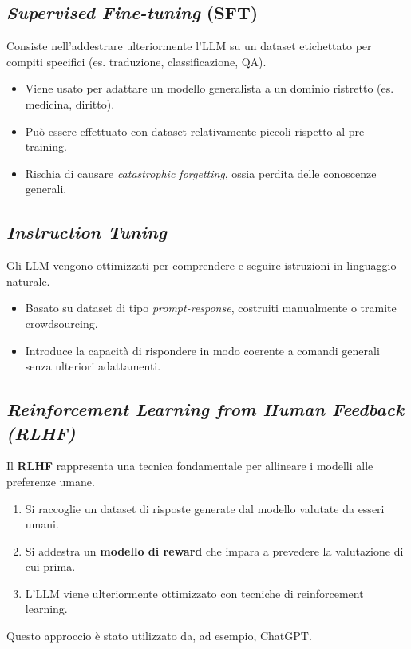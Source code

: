 \subsection{\textit{Supervised Fine-tuning} (SFT)}
Consiste nell'addestrare ulteriormente l'LLM su un dataset etichettato per compiti specifici (es. traduzione, classificazione, QA).
\begin{itemize}
    \item Viene usato per adattare un modello generalista a un dominio ristretto (es. medicina, diritto).
    \item Può essere effettuato con dataset relativamente piccoli rispetto al pre-training.
    \item Rischia di causare \textit{catastrophic forgetting}, ossia perdita delle conoscenze generali.
\end{itemize}

\subsection{\textit{Instruction Tuning}}
Gli LLM vengono ottimizzati per comprendere e seguire istruzioni in linguaggio naturale.
\begin{itemize}
    \item Basato su dataset di tipo \textit{prompt-response}, costruiti manualmente o tramite crowdsourcing.
    \item Introduce la capacità di rispondere in modo coerente a comandi generali senza ulteriori adattamenti.
\end{itemize}
\cite{chung2022scaling}

\subsection{\textit{Reinforcement Learning from Human Feedback (RLHF)}}
Il \textbf{RLHF} \cite{ziegler2019fine} rappresenta una tecnica fondamentale per allineare i modelli alle preferenze umane.
\begin{enumerate}
    \item Si raccoglie un dataset di risposte generate dal modello valutate da esseri umani.
    \item Si addestra un \textbf{modello di reward} che impara a prevedere la valutazione di cui prima.
    \item L'LLM viene ulteriormente ottimizzato con tecniche di reinforcement learning.
\end{enumerate}
Questo approccio è stato utilizzato da, ad esempio, ChatGPT.

